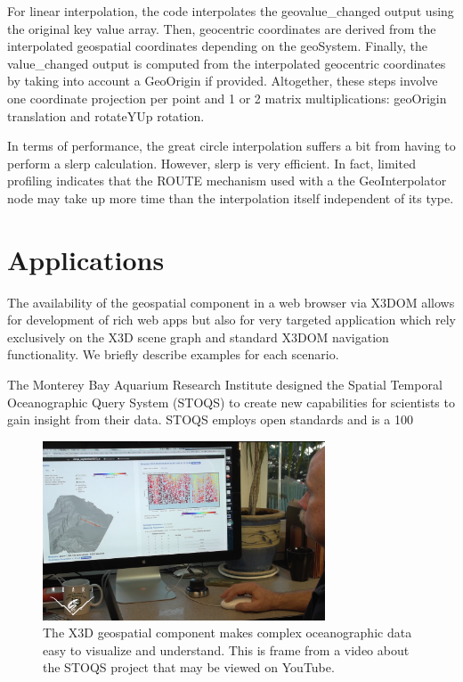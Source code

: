 \documentclass{acmsiggraph}                     %
\begin{document}
For linear interpolation, the code interpolates the geovalue\_changed output using the original key value array. Then, geocentric coordinates are derived from the interpolated geospatial coordinates depending on the geoSystem. Finally, the  value\_changed output is computed from the interpolated geocentric coordinates by taking into account a GeoOrigin if provided. Altogether, these steps involve one coordinate projection per point and 1 or 2 matrix multiplications: geoOrigin translation and rotateYUp rotation.

In terms of performance, the great circle interpolation suffers a bit from having to perform a slerp calculation. However, slerp is very efficient. In fact, limited profiling indicates that the ROUTE mechanism used with a the GeoInterpolator node may take up more time than the interpolation itself independent of its type.



\section{Applications}

The availability of the geospatial component in a web browser via X3DOM allows for development of rich  web apps but also for very targeted application which rely exclusively on the X3D scene graph and standard X3DOM navigation functionality. We briefly describe examples for each scenario.

The Monterey Bay Aquarium Research Institute designed the Spatial Temporal Oceanographic Query System (STOQS) \cite{mccann14} to create new capabilities for scientists to gain insight from their data. STOQS employs open standards and is a 100%

\begin{figure}[htbp]
\centering
\includegraphics[width=3.3in]{Application_STOQS.png}
\caption{The X3D geospatial component makes complex oceanographic data easy to visualize and understand. This is frame from a video about the STOQS project that may be viewed on YouTube.}
\label{fig:Application_STOQS.png}
\end{figure}
\end{document}
